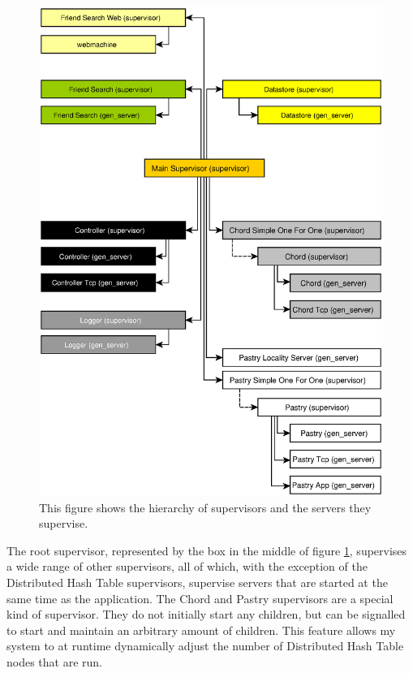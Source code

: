 \begin{figure}[!htb]
\begin{center}
	\includegraphics[width=0.9\linewidth]{illustrations/ClientSupervisionTree.eps}
  \caption{This figure shows the hierarchy of supervisors and the servers they supervise.}
  \label{figSupervisionTree}
\end{center}
\end{figure}

The root supervisor, represented by the box in the middle of figure \ref{figSupervisionTree}, supervises a wide range of other supervisors, all of which, with the exception of the Distributed Hash Table supervisors, supervise servers that are started at the same time as the application. 
The Chord and Pastry supervisors are a special kind of supervisor. They do not initially start any children, but can be signalled to start and maintain an arbitrary amount of children. This feature allows my system to at runtime dynamically adjust the number of Distributed Hash Table nodes that are run.


